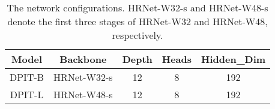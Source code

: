 \documentclass[runningheads]{llncs}
\begin{document}
\begin{center}
\begin{table}
  \caption{The network configurations. HRNet-W32-s and HRNet-W48-s denote the first three stages of HRNet-W32 and HRNet-W48, respectively.}
  \label{Setting_Table}
  \begin{center}
  \begin{tabular}{c|c|ccc}
  \toprule
  Model     & Backbone  & Depth  & Heads  & Hidden\_Dim \\
  \midrule
  \midrule
  DPIT-B    & HRNet-W32-s  & 12  & 8  & 192     \\
  DPIT-L    & HRNet-W48-s  & 12  & 8  & 192   \\
  \bottomrule
  \end{tabular}
  \end{center}
\end{table}
\end{center}
\end{document}
